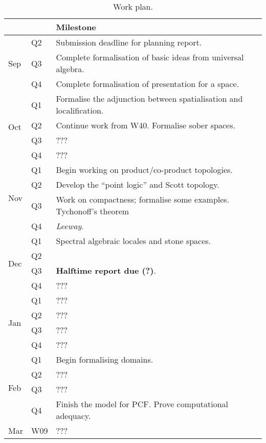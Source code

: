 \documentclass{article}
\begin{document}
\begin{table}[]\caption{Work plan.}\label{table:plan}
\begin{tabular}{lll}
                     &     & Milestone \\\hline \hline
\multirow{3}{*}{Sep} & Q2  & Submission deadline for planning report. \\
                     & Q3  & Complete formalisation of basic ideas from universal algebra. \\
                     & Q4  & Complete formalisation of presentation for a space. \\ \hline
\multirow{4}{*}{Oct} & Q1  & Formalise the adjunction between spatialisation and localification. \\
                     & Q2  & Continue work from W40. Formalise sober spaces. \\
                     & Q3  & ??? \\
                     & Q4  & ??? \\ \hline
\multirow{4}{*}{Nov} & Q1  & Begin working on product/co-product topologies. \\
                     & Q2  & Develop the ``point logic'' and Scott topology. \\
                     & Q3  & Work on compactness; formalise some examples. Tychonoff's theorem \\
                     & Q4  & \emph{Leeway}. \\ \hline
\multirow{4}{*}{Dec} & Q1  & Spectral algebraic locales and stone spaces. \\
                     & Q2  & \\
                     & Q3  & \textbf{Halftime report due (?)}. \\
                     & Q4  & ??? \\ \hline
\multirow{4}{*}{Jan} & Q1  & ??? \\
                     & Q2  & ??? \\
                     & Q3  & ??? \\
                     & Q4  & ??? \\ \hline
\multirow{4}{*}{Feb} & Q1  & Begin formalising domains. \\
                     & Q2  & ??? \\
                     & Q3  & ??? \\
                     & Q4  & Finish the model for PCF. Prove computational adequacy. \\ \hline
\multirow{4}{*}{Mar} & W09  & ??? \\

\end{tabular}
\end{table}
\end{document}

